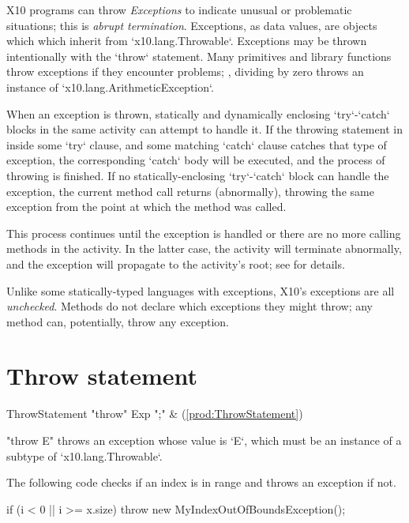 X10 programs can throw {\em Exceptions} to indicate unusual or problematic
situations; this is {\em abrupt termination}.  Exceptions, as data values, are
objects which which inherit from 
\xcd`x10.lang.Throwable`.    Exceptions may be thrown intentionally with the
\xcd`throw` statement. Many primitives and library functions throw exceptions
if they encounter problems; \eg, dividing by zero throws an instance of
\xcd`x10.lang.ArithmeticException`. 

When an exception is thrown, statically and dynamically enclosing
\xcd`try`-\xcd`catch` blocks in the same activity can attempt to handle it.   If the throwing
statement in inside some \xcd`try` clause, and some matching \xcd`catch`
clause catches that type of exception, the corresponding \xcd`catch` body will
be executed, and the process of throwing is finished.  
If no statically-enclosing \xcd`try`-\xcd`catch` block can handle the
exception, the current method call returns (abnormally), throwing the same
exception from the point at which the method was called.  

This process continues until the exception is handled or there are no more
calling methods in the activity. In the latter case, the activity will
terminate abnormally, and the exception will propagate to the activity's root;
see  for details.

Unlike some statically-typed languages with exceptions, X10's exceptions are
all {\em unchecked}. Methods do not declare which exceptions they might throw;
any method can, potentially, throw any exception.


\section{Throw statement}

\begin{bbgrammar}
      ThrowStatement \: \xcd"throw" Exp \xcd";" & (\ref{prod:ThrowStatement}) \\
\end{bbgrammar}

\xcd"throw E" throws an exception whose value is \xcd`E`, which must be an
instance of a subtype of \xcd`x10.lang.Throwable`. 

\begin{ex}
The following code checks if an index is in range and
throws an exception if not.

\begin{xten}
if (i < 0 || i >= x.size)
    throw new MyIndexOutOfBoundsException();
\end{xten}
\end{ex}

